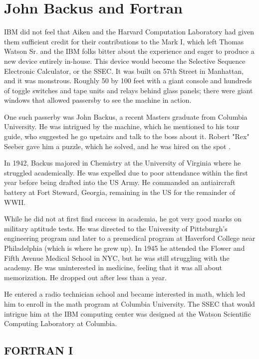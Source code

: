 \section{John Backus and Fortran}

IBM did not feel that Aiken and the Harvard Computation Laboratory had given
them sufficient credit for their contributions to the Mark I, which left
Thomas Watson Sr. and the IBM folks bitter about the experience and eager to
produce a new device entirely in-house. This device would become the Selective
Sequence Electronic Calculator, or the SSEC. It was built on 57th Street in
Manhattan, and it was monstrous. Roughly 50 by 100 feet with a giant console
and hundreds of toggle switches and tape units and relays behind glass panels;
there were giant windows that allowed passersby to see the machine in action.

One such passerby was John Backus, a recent Masters graduate from Columbia
University. He was intrigued by the machine, which he mentioned to his tour
guide, who suggested he go upstairs and talk to the boss about it. Robert "Rex"
Seeber gave him a puzzle, which he solved, and he was hired on the spot
\cite{backus_oral_history_2006}.

In 1942, Backus majored in Chemistry at the University of Virginia where he
struggled academically. He was expelled due to poor attendance within the first
year before being drafted into the US Army. He commanded an antiaircraft
battery at Fort Steward, Georgia, remaining in the US for the remainder of
WWII.

While he did not at first find success in academia, he got very good marks on
military aptitude tests. He was directed to the University of Pittsburgh's
engineering program and later to a premedical program at Haverford College near
Philadelphia (which is where he grew up). In 1945 he attended the Flower and
Fifth Avenue Medical School in NYC, but he was still struggling with the
academy. He was uninterested in medicine, feeling that it was all about
memorization. He dropped out after less than a year.

He entered a radio technician school and became interested in math, which led
him to enroll in the math program at Columbia University. The SSEC that would
intrigue him at the IBM computing center was designed at the Watson Scientific
Computing Laboratory at Columbia.

\subsection{FORTRAN I}

